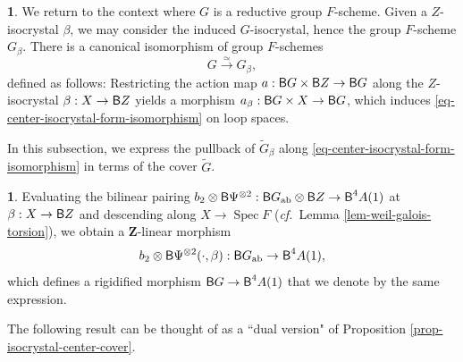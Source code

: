 \documentclass[10pt,english,reqno]{amsart}
\newcommand{\integers}{\mathbf Z}
\newcommand{\deloop}{\textnormal{\textsf{B}}}
\newcommand{\Spec}{\operatorname{Spec}}
\newcommand{\abelian}{\textnormal{ab}}
\theoremstyle{definition}
\numberwithin{equation}{section}
\newtheorem{untitledsubsubsection}[subsubsection]{}
\newenvironment{void}
{\begin{untitledsubsubsection}}
{\end{untitledsubsubsection}}
\begin{document}
\begin{void}
We return to the context where $G$ is a reductive group $F$-scheme. Given a $Z$-isocrystal $\beta$, we may consider the induced $G$-isocrystal, hence the group $F$-scheme $G_{\beta}$. There is a canonical isomorphism of group $F$-schemes
\begin{equation}
\label{eq-center-isocrystal-form-isomorphism}
G \xrightarrow{\simeq} G_{\beta},
\end{equation}
defined as follows: Restricting the action map $a : \deloop G \times \deloop Z \rightarrow \deloop G$ along the $Z$-isocrystal $\beta : X \rightarrow \deloop Z$ yields a morphism $a_{\beta} : \deloop G \times X \rightarrow \deloop G$, which induces \eqref{eq-center-isocrystal-form-isomorphism} on loop spaces.

In this subsection, we express the pullback of $\widetilde G_{\beta}$ along \eqref{eq-center-isocrystal-form-isomorphism} in terms of the cover $\widetilde G$.
\end{void}


\begin{void}
Evaluating the bilinear pairing $b_2 \otimes \deloop\Psi^{\otimes 2} : \deloop G_{\abelian} \otimes \deloop Z \rightarrow \deloop^4A(1)$ at $\beta : X \rightarrow \deloop Z$ and descending along $X\rightarrow \Spec F$ (\emph{cf.}~Lemma \ref{lem-weil-galois-torsion}), we obtain a $\integers$-linear morphism
\begin{equation}
\label{eq-bilinear-pairing-evaluation-at-center-isocrystal}
b_2\otimes \deloop\Psi^{\otimes 2}(\cdot, \beta) : \deloop G_{\abelian} \rightarrow \deloop^4A(1),
\end{equation}
which defines a rigidified morphism $\deloop G \rightarrow \deloop^4A(1)$ that we denote by the same expression.

The following result can be thought of as a ``dual version" of Proposition \ref{prop-isocrystal-center-cover}.
\end{void}

\end{document}
